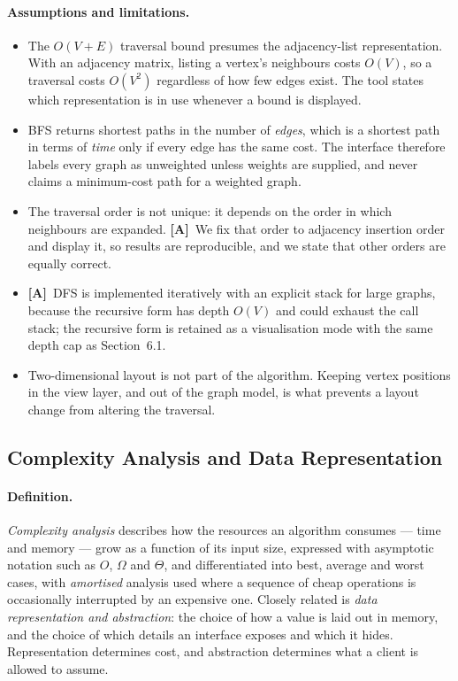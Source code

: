\documentclass[11pt,a4paper]{article}
\newcommand{\A}{\textcolor{asmc}{\textbf{[A]}}}     %
\begin{document}
\paragraph{Assumptions and limitations.}
\begin{itemize}[leftmargin=1.6em,itemsep=2pt]
  \item The $O(V+E)$ traversal bound presumes the adjacency-list representation. With an
        adjacency matrix, listing a vertex's neighbours costs $O(V)$, so a traversal costs
        $O(V^2)$ regardless of how few edges exist. The tool states which representation is
        in use whenever a bound is displayed.
  \item BFS returns shortest paths in the number of \emph{edges}, which is a shortest path in
        terms of \emph{time} only if every edge has the same cost. The interface therefore
        labels every graph as unweighted unless weights are supplied, and never claims a
        minimum-cost path for a weighted graph.
  \item The traversal order is not unique: it depends on the order in which neighbours are
        expanded. \A\ We fix that order to adjacency insertion order and display it, so
        results are reproducible, and we state that other orders are equally correct.
  \item \A\ DFS is implemented iteratively with an explicit stack for large graphs, because
        the recursive form has depth $O(V)$ and could exhaust the call stack; the recursive
        form is retained as a visualisation mode with the same depth cap as Section~6.1.
  \item Two-dimensional layout is not part of the algorithm. Keeping vertex positions in the
        view layer, and out of the graph model, is what prevents a layout change from
        altering the traversal.
\end{itemize}

\subsection{Complexity Analysis and Data Representation}

\paragraph{Definition.} \emph{Complexity analysis} describes how the resources an algorithm
consumes --- time and memory --- grow as a function of its input size, expressed with
asymptotic notation such as $O$, $\Omega$ and $\Theta$, and differentiated into best, average
and worst cases, with \emph{amortised} analysis used where a sequence of cheap operations is
occasionally interrupted by an expensive one. Closely related is \emph{data representation
and abstraction}: the choice of how a value is laid out in memory, and the choice of which
details an interface exposes and which it hides. Representation determines cost, and
abstraction determines what a client is allowed to assume.
\end{document}
